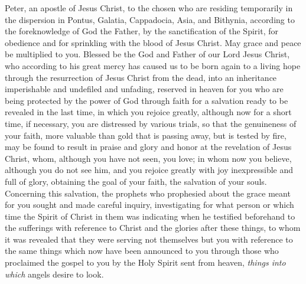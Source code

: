 
\begin{biblechapter} %
 Peter, an apostle of Jesus Christ, to the chosen who are residing temporarily in the dispersion in Pontus, Galatia, Cappadocia, Asia, and Bithynia,
\verse according to the foreknowledge of God the Father, by the sanctification of the Spirit, for obedience and for sprinkling with the blood of Jesus Christ. May grace and peace be multiplied to you.
 Blessed be the God and Father of our Lord Jesus Christ, who according to his great mercy has caused us to be born again to a living hope through the resurrection of Jesus Christ from the dead,
\verse into an inheritance imperishable and undefiled and unfading, reserved in heaven for you
\verse who are being protected by the power of God through faith for a salvation ready to be revealed in the last time,
\verse in which you rejoice greatly, although now for a short time, if necessary, you are distressed by various trials,
\verse so that the genuineness of your faith, more valuable than gold that is passing away, but is tested by fire, may be found to result in praise and glory and honor at the revelation of Jesus Christ,
\verse whom, although you have not seen, you love; in whom now you believe, although you do not see him, and you rejoice greatly with joy inexpressible and full of glory,
\verse obtaining the goal of your faith, the salvation of your souls.
\verse Concerning this salvation, the prophets who prophesied about the grace meant for you sought and made careful inquiry,
\verse investigating for what person or which time the Spirit of Christ in them was indicating when he testified beforehand to the sufferings with reference to Christ and the glories after these things,
\verse to whom it was revealed that they were serving not themselves but you with reference to the same things which now have been announced to you through those who proclaimed the gospel to you by the Holy Spirit sent from heaven, \textit{things into which} angels desire to look.

\end{biblechapter}
